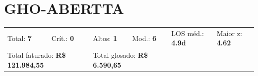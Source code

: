 \documentclass[a4paper,10pt]{article}
\begin{document}
\clearpage
\section{GHO-ABERTTA}
\begin{tcolorbox}[colback=lightblue,colframe=jcubeblue,title={\textbf{Resumo --- GHO-ABERTTA}}]
\begin{tabular}{ll@{\quad}ll@{\quad}ll}
Total: \textbf{7} &
Cr\'{i}t.: \textcolor{anomred}{\textbf{0}} &
Altos: \textcolor{anomorange}{\textbf{1}} &
Mod.: \textcolor{anomyellow}{\textbf{6}} &
LOS m\'{e}d.: \textbf{4.9d} &
Maior z: \textbf{4.62} \\

\multicolumn{2}{l}{Total faturado: \textbf{R\$ 121.984,55}} & 
\multicolumn{2}{l}{\textcolor{anomred}{Total glosado: \textbf{R\$ 6.590,65}}} & & \\

\end{tabular}
\end{tcolorbox}
\end{document}
